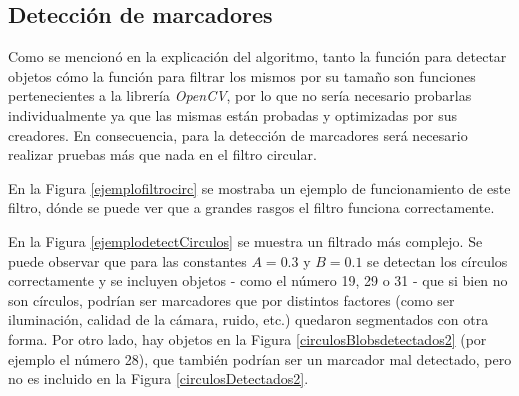 \subsection{Detección de marcadores}

Como se mencionó en la explicación del algoritmo, tanto la función para detectar objetos cómo la función para filtrar los mismos por su tamaño son funciones pertenecientes a la librería \emph{OpenCV}, por lo que no sería necesario probarlas individualmente ya que las mismas están probadas y optimizadas por sus creadores. En consecuencia, para la detección de marcadores será necesario realizar pruebas más que nada en el filtro circular.

En la Figura \ref{ejemplofiltrocirc} se mostraba un ejemplo de funcionamiento de este filtro, dónde se puede ver que a grandes rasgos el filtro funciona correctamente. 

En la Figura \ref{ejemplodetectCirculos} se muestra un filtrado más complejo. Se puede observar que para las constantes $A=0.3$ y $B=0.1$ se detectan los círculos correctamente y se incluyen objetos - como el número 19, 29 o 31 - que si bien no son círculos, podrían ser marcadores que por distintos factores (como ser iluminación, calidad de la cámara, ruido, etc.) quedaron segmentados con otra forma. Por otro lado, hay objetos en la Figura \ref{circulosBlobsdetectados2} (por ejemplo el número 28), que también podrían ser un marcador mal detectado, pero no es incluido en la Figura \ref{circulosDetectados2}.


